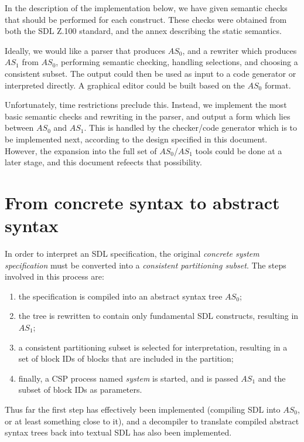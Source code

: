 In the description of the implementation below, we have given
semantic checks that should be performed for each construct. These
checks were obtained from both the SDL Z.100 standard, and the annex
describing the static semantics.

Ideally, we would like a parser that produces $AS_0$, and a rewriter
which produces $AS_1$ from $AS_0$, performing semantic checking,
handling selections, and choosing a consistent subset.
The  output could then be used as input to a code generator or interpreted
directly.
A graphical editor could be built based on the $AS_0$ format.

Unfortunately, time restrictions preclude this.
Instead, we implement the most basic semantic checks and rewriting
in the parser, and output a form which lies between $AS_0$ and
$AS_1$.
This is handled by the checker/code generator which
is to be implemented next, according to the design specified in this
document.
However, the expansion into the full set of $AS_0$/$AS_1$
tools could be done at a later stage, and this document refeects that
possibility.

\section{From concrete syntax to abstract syntax}

In order to interpret an SDL specification, the
original {\em concrete system specification} must be converted
into a {\em consistent partitioning subset}. 
The steps involved in this process are:

\begin{enumerate}
\item the specification is compiled into an abstract syntax tree 
$AS_0$;
\item the tree is rewritten to contain only fundamental SDL 
constructs, resulting in $AS_1$;
\item a consistent partitioning subset is selected for
interpretation, resulting in a set of block IDs of blocks that are
included in the partition;
\item finally, a CSP process named {\em system} is started, and is
passed $AS_1$ and the subset of block IDs as parameters.
\end{enumerate}

Thus far the first step has effectively been implemented (compiling SDL
into $AS_0$, or at least something close to it),
and a decompiler to translate compiled abstract syntax trees
back into textual SDL has also been implemented.

